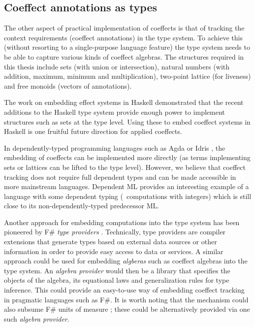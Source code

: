 
\subsection{Coeffect annotations as types}
\label{sec:further-impl-types}

The other aspect of practical implementation of coeffects is that of tracking the context requirements
(coeffect annotations) in the type system. To achieve this (without resorting to a single-purpose
language feature) the type system needs to be able to capture various kinds of coeffect algebras.
The structures required in this thesis include sets (with union or intersection), natural numbers (with
addition, maximum, minimum and multiplication), two-point lattice (for liveness) and free monoids
(vectors of annotations).

The work \cite{effects-embedding} on embedding effect systems in Haskell demonstrated that the
recent additions to the Haskell type system provide enough power to implement structures such
as sets at the type level. Using these to embed coeffect systems in Haskell is one fruitful
future direction for applied coeffects.

In dependently-typed programming languages such as Agda or Idris \cite{other-agda,other-idris},
the embedding of coeffects can be implemented more directly (as terms implementing sets or lattices
can be lifted to the type level). However, we believe that coeffect tracking does not require full
dependent types and can be made accessible in more mainstream languages. Dependent ML
\cite{types-dependent-ml} provides an interesting example of a language with some dependent typing
(\eg~computations with integers) which is still close to its non-dependently-typed predecessor ML.

Another approach for embedding computations into the type system has been pioneered by F\#
\emph{type providers} \cite{app-inforich}. Technically, type providers are compiler extensions
that generate types based on external data sources or other information in order to provide easy
access to data or services. A similar approach could be used for embedding \emph{algberas} such
as coeffect algebras into the type system. An \emph{algebra provider} would then be a library that
specifies the objects of the algebra, its equational laws and generalization rules for type inference.
This could provide an easy-to-use way of embedding coeffect tracking in pragmatic languages
such as F\#. It is worth noting that the mechanism could also subsume F\# units of measure
\cite{types-units-of-measure}; these could be alternatively provided via one such \emph{algebra
provider}.


